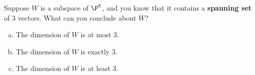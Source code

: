 \begin{applicationActivities}
\begin{activity}{5}
Suppose \(W\) is a subspace of \(\P^8\), and you know that
it contains a \textbf{spanning set} of \(3\) vectors.
What can you conclude about \(W\)?
\begin{enumerate}[(a)]
\item The dimension of \(W\) is at most 3.
\item The dimension of \(W\) is exactly 3.
\item The dimension of \(W\) is at least 3.
\end{enumerate}
\end{activity}



\end{applicationActivities}
